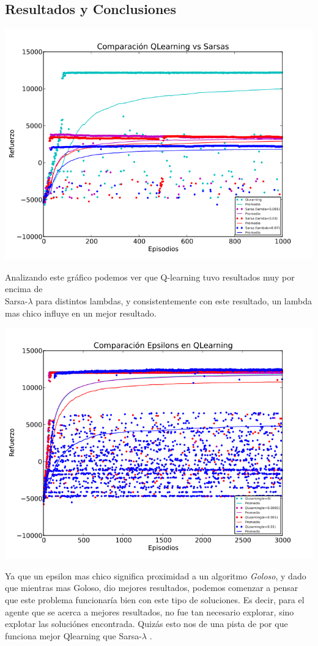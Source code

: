 \documentclass[11pt, a4paper]{article}
\newcommand{\slambda}{Sarsa-$\lambda$ }
\begin{document}
\newpage

\subsection{Resultados y Conclusiones}
\includegraphics[scale=0.6]{Graf1}

Analizando este gr\'afico podemos ver que Q-learning tuvo resultados muy por encima de\\ \slambda para distintos lambdas, y consistentemente con este resultado, un lambda mas chico influye en un mejor resultado.

\includegraphics[scale=0.6]{Graf2}

Ya que un epsilon mas chico significa proximidad a un algoritmo \textit{Goloso}, y dado que mientras mas Goloso, dio mejores resultados, podemos comenzar a pensar que este problema funcionar\'ia bien con este tipo de soluciones. 
Es decir, para el agente que se acerca a mejores resultados, no fue tan necesario explorar, sino explotar las soluci\'ones encontrada. Quiz\'as esto nos de una pista de por que funciona mejor Qlearning que \slambda.
\end{document}
